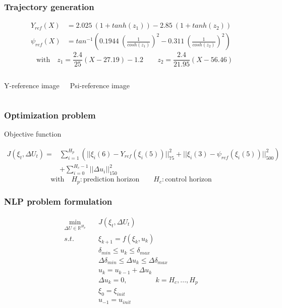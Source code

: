 \documentclass{beamer}
\begin{document}
\begin{frame}
\frametitle{Trajectory generation}

\begin{align*}
Y_{ref}(X) &= 2.025 \ (1 + tanh(z_1)) - 2.85 \ (1 + tanh(z_2)) \\
\psi_{ref}(X) &= tan^{-1} \left( 0.1944 \ \left(\frac{1}{cosh(z_1)}\right)^2 - 0.311 \ \left(\frac{1}{cosh(z_2)}\right)^2 \right)
\end{align*}
\[\quad \text{with} \quad z_1 = \frac{2.4}{25}(X - 27.19) - 1.2 \qquad z_2 = \frac{2.4}{21.95}(X - 56.46) \]


\begin{columns}[t,onlytextwidth]
Y-reference image

Psi-reference image

\end{columns}

\end{frame}






\begin{frame}
\frametitle{Optimization problem}

\begin{block}{Objective function}


\begin{align*}
J(\xi_t, \Delta U_t) = &\sum_{i=1}^{H_p} \left( ||\xi_i(6) - Y_{ref}(\xi_i(5)) ||_{75}^2 + ||\xi_i(3) - \psi_{ref}(\xi_i(5)) ||_{500}^2 \right) \\
&+ \sum_{i=0}^{H_c-1} || \Delta u_i ||_{150}^2
\end{align*}
\[\text{with} \quad H_p : \text{prediction horizon} \qquad H_c : \text{control
horizon}\]


\end{block}

\end{frame}







\begin{frame}
\frametitle{NLP problem formulation}

\begin{align*}
\min_{\Delta U \in \mathbb{R}^{H_p}} \quad &J(\xi_t, \Delta U_t) \\
s.t. \qquad &\xi_{k+1} = f(\xi_k, u_k) \\
&\delta_{min} \leq u_k \leq \delta_{max} \\
&\Delta \delta_{min} \leq \Delta u_k \leq \Delta \delta_{max} \\
&u_k = u_{k-1} + \Delta u_k \\
&\Delta u_k = 0, \qquad \qquad k = H_c, . . . , H_p \\
&\xi_0 = \xi_{init} \\
& u_{-1} = u_{init}
\end{align*}

\end{frame}
\end{document}
